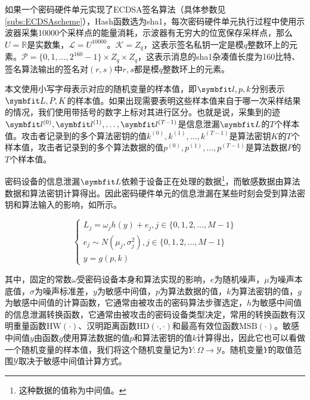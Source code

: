 {	\begin{example}
		如果一个密码硬件单元实现了ECDSA签名算法（具体参数见\ref{subs:ECDSAscheme}），Hash函数选为sha1\citep{FIPS180-4}，每次密码硬件单元执行过程中使用示波器采集10000个采样点的能量消耗，示波器有无穷大的位宽保存采样点，那么$U=\mathbb R$是实数集，$\mathcal L=U^{10000}$。$\mathcal K=Z_q$，这表示签名私钥一定是模$q$整数环上的元素。$\mathcal P=\{0,1,\dots,2^{160}-1\}\times Z_q\times Z_q$，这表示消息的sha1杂凑值长度为160比特、签名算法输出的签名对$(r,s)$中$r,s$都是模$q$整数环上的元素。
	\end{example}
	
	
	本文使用小写字母表示对应的随机变量的样本值，即$\Vector l,p,k$分别表示$\Vector L,P,K$的样本值。如果出现需要表明这些样本值来自于哪一次采样结果的情况，我们使用带括号的数字上标对其进行区分。也就是说，采集到的迹$\Vector {l^{(0)}}, \Vector {l^{(1)}}, \dots, \Vector {l^{(T-1)}}$是信息泄漏$\Vector L$的$T$个样本值。攻击者记录到的多个算法密钥的值$k^{(0)}, k^{(1)}, \dots, k^{(T-1)}$是算法密钥$K$的$T$个样本值，攻击者记录到的多个算法数据的值$p^{(0)}, p^{(1)}, \dots, p^{(T-1)}$是算法数据$P$的$T$个样本值。
	
	密码设备的信息泄漏$\Vector L$依赖于设备正在处理的数据\footnote{这种数据的值称为中间值。}，而敏感数据由算法数据和算法密钥计算得出。因此密码硬件单元的信息泄漏在某些时刻会受到算法密钥和算法输入的影响，如所示。
	
	\begin{equation}
		\begin{cases}
			L_j=\omega_j h(y)+e_j,j\in\{0,1,2,\dots,M-1\}\\
			e_j\sim N(\mu_j,\sigma_j^2),j\in\{0,1,2,\dots,M-1\}\\
			y=g(p,k)
		\end{cases}\label{eq:leakagedetail}
	\end{equation}
	
	\noindent 其中，固定的常数$\omega$受密码设备本身和算法实现的影响，$e$为随机噪声，$\mu$为噪声本底值，$\sigma$为噪声标准差，$y$为敏感中间值，$p$为算法数据的值，$k$为算法密钥的值，$g$为敏感中间值的计算函数，它通常由被攻击的密码算法步骤选定，$h$为敏感中间值的信息泄漏转换函数，它通常由被攻击的密码设备类型决定，常用的转换函数有汉明重量函数$\mathrm {HW}(\cdot)$、汉明距离函数$\mathrm {HD}(\cdot,\cdot)$和最高有效位函数$\mathrm {MSB}(\cdot)$。敏感中间值$y$由函数$g$使用算法数据的值$p$和算法密钥的值$k$计算得出，因此它也可以看做一个随机变量的样本值，我们将这个随机变量记为$Y:\mathcal \Omega\rightarrow \mathcal Y$。随机变量$Y$的取值范围$\mathcal Y$取决于敏感中间值计算方式。
	
}
